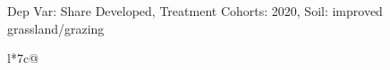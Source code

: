 \begin{table}[H]
\captionlistentry[table]{}
\label{table:beaver_land_class_DVis_land_class_3_SCg3_SSIGRG}
\scriptsize %
Dep Var: Share Developed, Treatment Cohorts: 2020, Soil: improved grassland/grazing \\
\begin{threeparttable}
\begin{tabulary}{\textwidth}{l*{7}{c}@{}}
\toprule \toprule
\noalign{\smallskip}
\noalign{\smallskip}
\midrule \bottomrule
\end{tabulary}
\medskip
\end{threeparttable}
\end{table}
